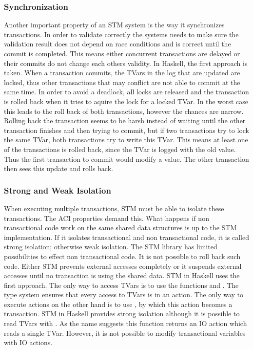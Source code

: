 \subsubsection{Synchronization} Another important property of an STM system is the way it synchronizes transactions. In order to validate
correctly the systems needs to make sure the validation result does not depend on race conditions and is correct until the commit 
is completed. This means either concurrent transactions are delayed or their commits do not change each others validity. In Haskell, the first
approach is taken. When a transaction commits, the TVars in the log that are updated are locked, thus other transactions that may conflict are not 
able to commit at the same time. In order to avoid a deadlock, all locks are released and the transaction
is rolled back when it tries to aquire the lock for a locked TVar. In the worst case this leads to the roll back of both transactions, 
however the chances are narrow. Rolling back the transaction seems to be harsh instead of waiting until the other transaction finishes 
and then trying to commit, but if two transactions try to lock the same TVar, both transactions try to write this TVar. 
This means at least one of the transactions is rolled back, since the TVar is logged with the old value. 
Thus the first transaction to commit would modify a value. The other transaction then sees this update and rolls back.

\subsubsection{Strong and Weak Isolation} When executing multiple transactions, STM must be able to isolate these transactions.
The ACI properties demand this. What happens if non transactional code work on the same shared data structures is up to the STM 
implementation. If it isolates transactional and non transactional code, it is called strong isolation; otherwise weak isolation.
The STM library has limited possibilities to effect non transactional code. It is not possible to roll back such code. Either STM prevents 
external accesses completely or it suspends external accesses until no transaction is using the shared data. STM in Haskell uses 
the first approach. The only way to access TVars is to use the functions  and . The type system 
ensures that every access to TVars is in an  action. The only way to execute  actions on the other hand is
to use , by which this action becomes a transaction. STM in Haskell provides strong isolation although it is possible 
to read TVars with . As the name suggests this function returns an IO action which reads a single TVar. 
However, it is not possible to modify transactional variables with IO actions. 


